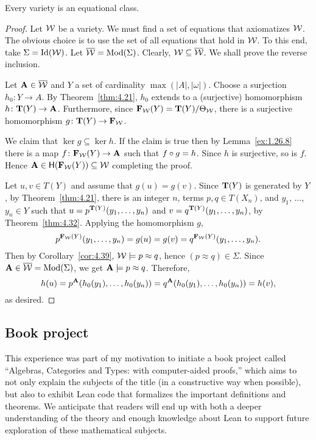 \documentclass[11pt]{amsart}  %
\begin{document}
\begin{theorem}
  \label{thm:4.41}
Every variety is an equational class.
\end{theorem}
\begin{proof}
Let $\mathcal{W}$ be a variety. We must find a set of equations that axiomatizes $\mathcal{W}$. 
The obvious choice is to use the set of all equations that hold in $\mathcal{W}$. 
To this end, take $\Sigma = \operatorname{Id}(\mathcal{W})$. Let $\overline{\mathcal{W}} = \operatorname{Mod}(\Sigma)$. 
Clearly, $\mathcal{W} \subseteq \overline{\mathcal{W}}$. We shall prove the reverse inclusion.

Let $\mathbf{A} \in \overline{\mathcal{W}}$ and $Y$ a set of cardinality $\max(|A|, |\omega|)$. 
Choose a surjection $h_0\colon Y \to A$. By Theorem~\ref{thm:4.21}, $h_0$ extends to 
a (surjective) homomorphism $h \colon \mathbf{T}(Y) \to \mathbf{A}$. Furthermore, since 
$\mathbf{F}_{\mathcal{W}}(Y) = \mathbf{T}(Y)/\Theta_{\mathcal{W}}$, there is a surjective homomorphism
$g \colon \mathbf{T}(Y) \to \mathbf{F}_{\mathcal{W}}$.

We claim that $\ker g \subseteq \ker h$. 
If the claim is true then by Lemma~\ref{ex:1.26.8} there is a map 
$f\colon \mathbf{F}_{\mathcal{W}}(Y) \to \mathbf{A}$ such that $f \circ g = h$. 
Since $h$ is surjective, so is $f$. Hence 
$\mathbf{A} \in \mathsf{H}(\mathbf{F}_{\mathcal{W}}(Y)) \subseteq \mathcal{W}$ completing the proof.

Let $u,v \in T(Y)$ and assume that $g(u) = g(v)$. 
Since $\mathbf{T}(Y)$ is generated by $Y$, by Theorem~\ref{thm:4.21}, 
there is an integer $n$, terms $p, q \in T(X_n)$, and 
$y_1$, $\dots$, $y_n \in Y$ such that $u = p^{\mathbf{T}(Y)}(y_1,\dots, y_n)$ and 
$v = q^{\mathbf{T}(Y)}(y_1,\dots, y_n)$, by Theorem~\ref{thm:4.32}. 
Applying the homomorphism $g$,
\[
 p^{\mathbf{F}_{\mathcal{W}}(Y)}(y_1,\dots, y_n) = g(u) = g(v) = 
 q^{\mathbf{F}_{\mathcal{W}}(Y)}(y_1,\dots, y_n).
 \]
 Then by Corollary~\ref{cor:4.39}, $\mathcal{W} \models p \approx q$, hence 
 $(p \approx q) \in \Sigma$. 
 Since $\mathbf{A} \in \overline{\mathcal{W}} = \operatorname{Mod}(\Sigma)$,
 we get $\mathbf{A} \models p \approx q$. Therefore, 
 \[
  h(u) = p^{\mathbf{A}}(h_0(y_1), \dots, h_0(y_n))
  = q^{\mathbf{A}}(h_0(y_1), \dots, h_0(y_n)) = h(v),
  \]
 as desired.
\end{proof}

\subsection{Book project}  This experience was part of my motivation to 
initiate a book project called ``Algebras, Categories and Types: with computer-aided proofs,'' 
which aims to not only explain the subjects of the title (in a constructive way when possible),
but also to exhibit Lean code that formalizes the important definitions and theorems.
We anticipate that readers will end up with both a deeper understanding of
the theory and enough knowledge about Lean to support future exploration of these
mathematical subjects.
\end{document}
